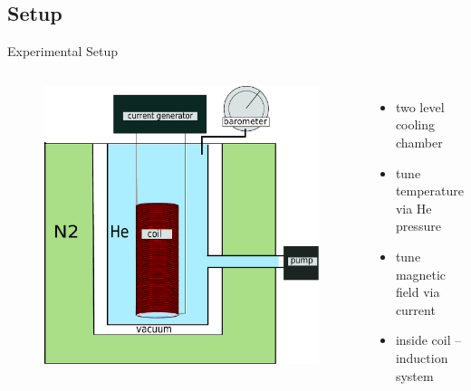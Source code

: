 \documentclass{beamer}
\begin{document}
\subsection{Setup} %
\begin{frame}{Experimental Setup}
\begin{columns}
\begin{figure}
\centering
\includegraphics[height=0.6\textheight]{img/Zeichnung.pdf}
\end{figure}
\begin{itemize}[<+->]
\item two level cooling chamber
\item tune temperature via He pressure
\item tune magnetic field via current
\item inside coil -- induction system
\end{itemize}
\end{columns}

\end{frame}
\end{document}
